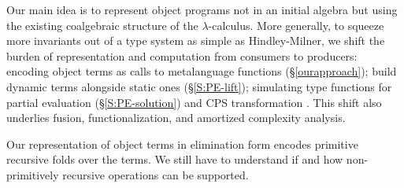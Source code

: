 Our main idea is to represent object programs not in an initial algebra
but using the existing coalgebraic structure of the $\lambda$-calculus.
More generally, to squeeze more invariants out of a type system as
simple as Hindley-Milner, we shift the burden of representation and
computation from consumers to producers: encoding object terms as calls
to metalanguage functions (\S\ref{ourapproach}); build dynamic terms
alongside static ones (\S\ref{S:PE-lift}); simulating type functions for
partial evaluation (\S\ref{S:PE-solution}) and CPS
transformation%
.
This shift also underlies fusion,
functionalization, and amortized complexity analysis.
\begin{comment}
When the metalanguage does provide higher-rank and higher-kind
polymorphism, we can type-check and compile an object term separately
from any interpreters it may be plugged into.
\end{comment}

Our representation of object terms in elimination form encodes
primitive recursive folds over the terms. 
We still
have to understand if and how non-primitively 
recursive operations can be supported.



\bibsep=0pt

% 

